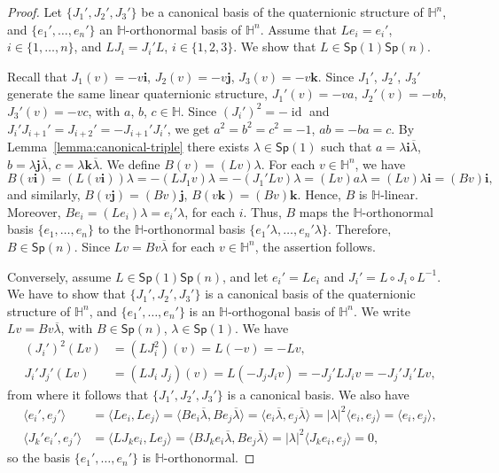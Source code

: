 \documentclass[12pt, a4paper,draft]{amsart}
\newcommand{\id}{\operatorname{id}}
\renewcommand{\H}{\mathbb{H}}
\newcommand{\Sp}{\mathsf{Sp}}
\theoremstyle{remark}
\begin{document}
\begin{proof}
Let $\{J_1',J_2',J_3'\}$ be a canonical basis of the quaternionic structure of $\H^n$, and $\{e_1',\dots,e_n'\}$ an $\H$-orthonormal basis of $\H^n$.
Assume that $Le_i=e_i'$, $i\in\{1,\dots,n\}$, and $L J_i=J_i' L$, $i\in\{1,2,3\}$.
We show that $L\in\Sp(1)\Sp(n)$.

Recall that $J_1(v)=-v\mathbf{i}$, $J_2(v)=-v\mathbf{j}$, $J_3(v)=-v\mathbf{k}$.
Since $J_1'$, $J_2'$, $J_3'$ generate the same linear quaternionic structure, $J_1'(v)=-va$, $J_2'(v)=-vb$, $J_3'(v)=-vc$, with $a$, $b$, $c\in\H$.
Since $(J_i')^2=-\id$ and $J_i'J_{i+1}'=J_{i+2}'=-J_{i+1}'J_i'$, we get $a^2=b^2=c^2=-1$, $ab=-ba=c$.
By Lemma~\ref{lemma:canonical-triple} there exists $\lambda\in\Sp(1)$ such that $a=\lambda\mathbf{i}\overline{\lambda}$, $b=\lambda\mathbf{j}\overline{\lambda}$, $c=\lambda\mathbf{k}\overline{\lambda}$.
We define $B(v)=(Lv)\lambda$.
For each $v\in\H^n$, we have
\[
B(v\mathbf{i})
=(L(v\mathbf{i}))\lambda
=-(LJ_1v)\lambda
=-(J_1'Lv)\lambda
=(Lv)a\lambda
=(Lv)\lambda\mathbf{i}
=(Bv)\mathbf{i},
\]
and similarly, $B(v\mathbf{j})=(Bv)\mathbf{j}$, $B(v\mathbf{k})=(Bv)\mathbf{k}$.
Hence, $B$ is $\H$-linear.
Moreover, $Be_i=(Le_i)\lambda=e_i'\lambda$, for each $i$.
Thus, $B$ maps the $\H$-orthonormal basis $\{e_1,\dots,e_n\}$ to the $\H$-orthonormal basis $\{e_1'\lambda,\dots,e_n'\lambda\}$.
Therefore, $B\in\Sp(n)$.
Since $Lv=Bv\overline{\lambda}$ for each $v\in\H^n$, the assertion follows.

Conversely, assume $L\in\Sp(1)\Sp(n)$, and let $e_i'=Le_i$ and $J_i'=L\circ J_i\circ L^{-1}$.
We have to show that $\{J_1',J_2',J_3'\}$ is a canonical basis of the quaternionic structure of $\H^n$, and $\{e_1',\dots,e_n'\}$ is an $\H$-orthogonal basis of $\H^n$.
We write $Lv=Bv\overline{\lambda}$, with $B\in\Sp(n)$, $\lambda\in\Sp(1)$.
We have
\[
\begin{aligned}
(J_i')^2(Lv)
&{}=(L J_i^2)(v)
=L(-v)=-Lv,\\
J_i'J_j'(Lv)
&{}=(L J_i\ J_j)(v)
=L(-J_j J_i v)
=-J_j' L J_i v
=-J_j' J_i' Lv,
\end{aligned}
\]
from where it follows that $\{J_1',J_2',J_3'\}$ is a canonical basis.
We also have
\[
\begin{aligned}
\langle e_i',e_j'\rangle
&{}=\langle Le_i,Le_j\rangle
=\langle Be_i\overline{\lambda},Be_j\overline{\lambda}\rangle
=\langle e_i\overline{\lambda},e_j\overline{\lambda}\rangle
=\lvert\lambda\rvert^2\langle e_i,e_j\rangle
=\langle e_i,e_j\rangle,\\
\langle J_k'e_i',e_j'\rangle
&{}=\langle L J_k e_i,L e_j\rangle
=\langle BJ_k e_i\overline{\lambda},B e_j\overline{\lambda}\rangle
=\lvert\lambda\rvert^2\langle J_k e_i,e_j\rangle=0,
\end{aligned}
\]
so the basis $\{e_1',\dots,e_n'\}$ is $\H$-orthonormal.
\end{proof}
\end{document}

